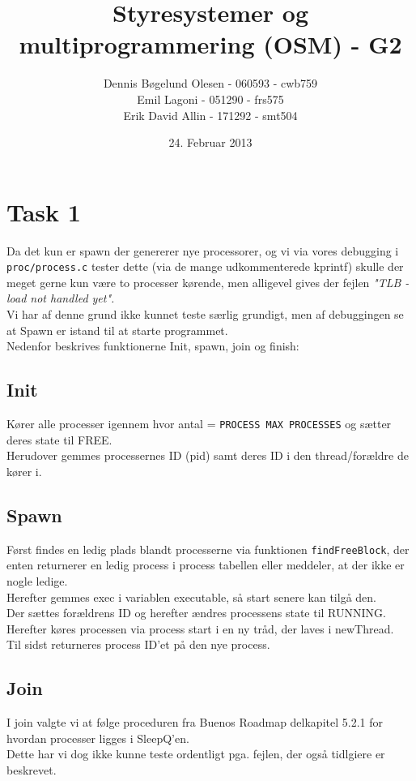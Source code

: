 \documentclass[a4paper,12pt]{article}
\title{Styresystemer og multiprogrammering (OSM) - G2}
\author{Dennis Bøgelund Olesen - 060593 - cwb759 \\ Emil Lagoni - 051290 - frs575 \\ Erik David Allin - 171292 - smt504}
\date{24. Februar 2013}
\begin{document}
\maketitle %
\thispagestyle{empty}
\setcounter{page}{0}
\newpage




\section*{Task 1}
Da det kun er spawn der genererer nye processorer, og vi via vores debugging i \texttt{proc/process.c} tester dette (via de mange udkommenterede kprintf) skulle der meget gerne kun være to processer kørende, men alligevel gives der fejlen \textit{"TLB - load not handled yet". }
\\
Vi har af denne grund ikke kunnet teste særlig grundigt, men af debuggingen se at Spawn er istand til at starte programmet. 
\\[5px]
Nedenfor beskrives funktionerne Init, spawn, join og finish:
\subsection*{Init}
Kører alle processer igennem hvor antal = \texttt{PROCESS MAX PROCESSES} og sætter deres state til FREE. 
\\
Herudover gemmes processernes ID (pid) samt deres ID i den thread/forældre de kører i. 


\subsection*{Spawn}
Først findes en ledig plads blandt processerne via funktionen \texttt{findFreeBlock}, der enten returnerer en ledig process i process tabellen eller meddeler, at der ikke er nogle ledige. 
\\
Herefter gemmes exec i variablen executable, så start senere kan tilgå den. \\
Der sættes forældrens ID og herefter ændres processens state til RUNNING.
\\
Herefter køres processen via process start i en ny tråd, der laves i newThread.
\\
Til sidst returneres process ID'et på den nye process.


\subsection*{Join}
I join valgte vi at følge proceduren fra Buenos Roadmap delkapitel 5.2.1 for hvordan processer ligges i SleepQ'en. \\
Dette har vi dog ikke kunne teste ordentligt pga. fejlen, der også tidlgiere er beskrevet.
\end{document}
